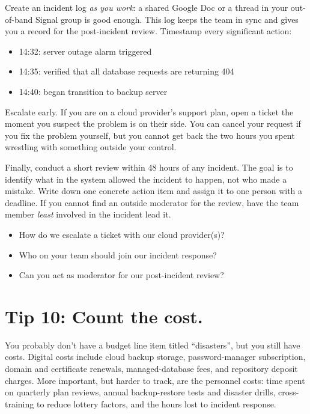 \documentclass[10pt,letterpaper]{article}
\begin{document}
Create an incident log \emph{as you work}: a shared Google Doc or a thread in
your out-of-band Signal group is good enough.  This log keeps the team in sync
and gives you a record for the post-incident review.  Timestamp every
significant action:

\begin{itemize}
\item 14:32: server outage alarm triggered
\item 14:35: verified that all database requests are returning 404
\item 14:40: began transition to backup server
\end{itemize}

Escalate early. If you are on a cloud provider's support plan, open a ticket the
moment you suspect the problem is on their side. You can cancel your request if
you fix the problem yourself, but you cannot get back the two hours you spent
wrestling with something outside your control.

Finally, conduct a short review within 48 hours of any incident. The goal is to
identify what in the system allowed the incident to happen, not who made a
mistake. Write down one concrete action item and assign it to one person with a
deadline. If you cannot find an outside moderator for the review, have the team
member \emph{least} involved in the incident lead it.

\begin{notebox}
  \begin{itemize}
  \item How do we escalate a ticket with our cloud provider(s)?
  \item Who on your team should join our incident response?
  \item Can you act as moderator for our post-incident review?
  \end{itemize}
\end{notebox}

\section*{Tip 10: Count the cost.}

You probably don't have a budget line item titled ``disasters'', but you still
have costs.  Digital costs include cloud backup storage, password-manager
subscription, domain and certificate renewals, managed-database fees, and
repository deposit charges.  More important, but harder to track, are the
personnel costs: time spent on quarterly plan reviews, annual backup-restore
tests and disaster drills, cross-training to reduce lottery factors, and the
hours lost to incident response.
\end{document}
